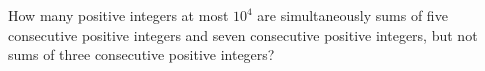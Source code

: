 How many positive integers at most $10^4$ are simultaneously sums of five consecutive positive integers and seven consecutive positive integers, but not sums of three consecutive positive integers?
